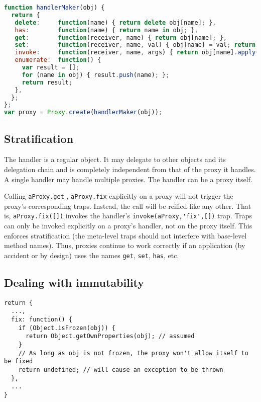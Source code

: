 \documentclass[10pt,legalpaper]{article}
\begin{document}
\begin{lstlisting}[language=javascript]
function handlerMaker(obj) {
  return {
   delete:     function(name) { return delete obj[name]; },    
   has:        function(name) { return name in obj; },
   get:        function(receiver, name) { return obj[name]; },
   set:        function(receiver, name, val) { obj[name] = val; return true; },
   invoke:     function(receiver, name, args) { return obj[name].apply(obj,args); },
   enumerate:  function() {
     var result = [];
     for (name in obj) { result.push(name); };
     return result;
   }, 
  };
};
var proxy = Proxy.create(handlerMaker(obj));
\end{lstlisting}

\subsection{Stratification}

The handler is a regular object. It may delegate to other objects and its delegation chain and is completely independent from that of the proxy it handles. A single handler may handle multiple proxies. The handler can be a proxy itself.

Calling \lstinline{aProxy.get} , \lstinline{aProxy.fix} explicitly on a proxy will not trigger the proxy’s corresponding traps. Instead, the call will be reified like any other. That is, \lstinline{aProxy.fix([])} invokes the handler’s \lstinline{invoke(aProxy,'fix',[])} trap. Traps can only be invoked explicitly on a proxy’s handler, not on the proxy itself. This enforces stratification (the meta-level traps should not interfere with base-level method names). Thus, proxies continue to work correctly if an application (by accident or by design) uses the names \texttt{get}, \texttt{set}, \texttt{has}, etc.

\subsection{Dealing with immutability}


\begin{lstlisting}
return {
  ...,
  fix: function() {
    if (Object.isFrozen(obj)) {
      return Object.getOwnProperties(obj); // assumed
    }
    // As long as obj is not frozen, the proxy won't allow itself to be fixed
    return undefined; // will cause an exception to be thrown
  },
  ...
}
\end{lstlisting}
\end{document}
